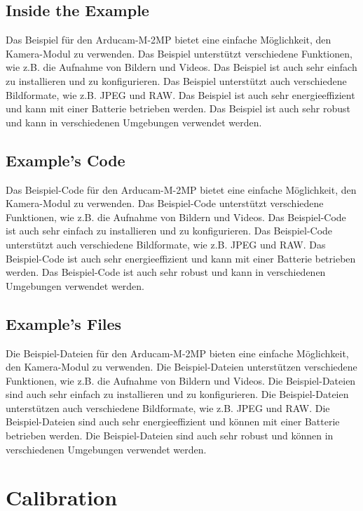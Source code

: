 \subsection{Inside the Example}

Das Beispiel für den Arducam-M-2MP bietet eine einfache Möglichkeit, den Kamera-Modul zu verwenden. Das Beispiel unterstützt verschiedene Funktionen, wie z.B. die Aufnahme von Bildern und Videos. Das Beispiel ist auch sehr einfach zu installieren und zu konfigurieren. Das Beispiel unterstützt auch verschiedene Bildformate, wie z.B. JPEG und RAW. Das Beispiel ist auch sehr energieeffizient und kann mit einer Batterie betrieben werden. Das Beispiel ist auch sehr robust und kann in verschiedenen Umgebungen verwendet werden.

\subsection{Example's Code}

Das Beispiel-Code für den Arducam-M-2MP bietet eine einfache Möglichkeit, den Kamera-Modul zu verwenden. Das Beispiel-Code unterstützt verschiedene Funktionen, wie z.B. die Aufnahme von Bildern und Videos. Das Beispiel-Code ist auch sehr einfach zu installieren und zu konfigurieren. Das Beispiel-Code unterstützt auch verschiedene Bildformate, wie z.B. JPEG und RAW. Das Beispiel-Code ist auch sehr energieeffizient und kann mit einer Batterie betrieben werden. Das Beispiel-Code ist auch sehr robust und kann in verschiedenen Umgebungen verwendet werden.

\subsection{Example's Files}

Die Beispiel-Dateien für den Arducam-M-2MP bieten eine einfache Möglichkeit, den Kamera-Modul zu verwenden. Die Beispiel-Dateien unterstützen verschiedene Funktionen, wie z.B. die Aufnahme von Bildern und Videos. Die Beispiel-Dateien sind auch sehr einfach zu installieren und zu konfigurieren. Die Beispiel-Dateien unterstützen auch verschiedene Bildformate, wie z.B. JPEG und RAW. Die Beispiel-Dateien sind auch sehr energieeffizient und können mit einer Batterie betrieben werden. Die Beispiel-Dateien sind auch sehr robust und können in verschiedenen Umgebungen verwendet werden.

\section{Calibration}

